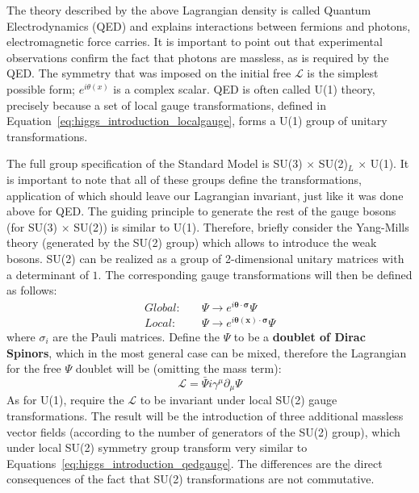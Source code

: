 The theory described by the above Lagrangian density is called Quantum Electrodynamics (QED) and explains interactions between fermions and photons, electromagnetic force carries. It is important to point out that experimental observations confirm the fact that photons are massless, as is required by the QED. The symmetry that was imposed on the initial free $\mathcal{L}$ is the simplest possible form; $e^{i\theta(x)}$ is a complex scalar. QED is often called U(1) theory, precisely because a set of local gauge transformations, defined in Equation~\ref{eq:higgs_introduction_localgauge}, forms a U(1) group of unitary transformations.

The full group specification of the Standard Model is SU(3) $\times$ SU(2)$_L$ $\times$ U(1). It is important to note that all of these groups define the transformations, application of which should leave our Lagrangian invariant, just like it was done above for QED. The guiding principle to generate the rest of the gauge bosons (for SU(3) $\times$ SU(2)) is similar to U(1). Therefore, briefly consider the Yang-Mills theory (generated by the SU(2) group) which allows to introduce the weak bosons. SU(2) can be realized as a group of 2-dimensional unitary matrices with a determinant of $1$. The corresponding gauge transformations will then be defined as follows:
\begin{subequations}\label{eq:higgs_introduction_gaugesu2}
\begin{align}
    Global:&\quad \Psi \rightarrow e^{i\boldsymbol{\theta} \cdot \boldsymbol{\sigma}}\Psi\\
    Local:&\quad \Psi \rightarrow e^{i\boldsymbol{\theta(x)} \cdot \boldsymbol\sigma}\Psi\label{eq:higgs_introduction_localgaugesu2}
\end{align}
\end{subequations}
where $\sigma_{i}$ are the Pauli matrices. Define the $\Psi$ to be a \textbf{doublet of Dirac Spinors}, which in the most general case can be mixed, therefore the Lagrangian for the free $\Psi$ doublet will be (omitting the mass term):
\begin{equation}
    \label{eq:higgs_introduction_lagrangiagnsu2free}
    \mathcal{L} = \bar{\Psi}i\gamma^{\mu}\partial_{\mu}\Psi
\end{equation}
As for U(1), require the $\mathcal{L}$ to be invariant under local SU(2) gauge transformations. The result will be the introduction of three additional massless vector fields (according to the number of generators of the SU(2) group), which under local SU(2) symmetry group transform very similar to Equations~\ref{eq:higgs_introduction_qedgauge}. The differences are the direct consequences of the fact that SU(2) transformations are not commutative.


